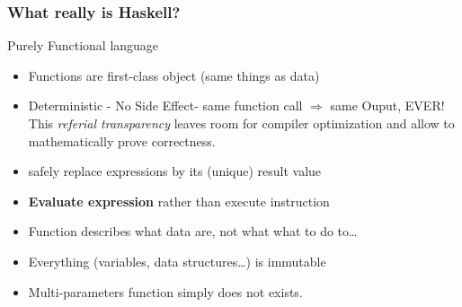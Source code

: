 	\begin{frame}[fragile]\frametitle{What really is Haskell?}
		\begin{block}{Purely Functional language}
			\begin{itemize}
			  \item Functions are first-class object (same things as data)
			\item Deterministic - No Side Effect- same function call $\Rightarrow$ same
			Ouput, EVER!\\
			This \emph{referial transparency} leaves room for compiler optimization and 
			allow to mathematically prove correctness.
			\item safely replace expressions by its (unique) result value
			\item \textbf{Evaluate expression} rather than execute instruction
			\item Function describes what data are, not what what to do to\ldots
			\item Everything (variables, data structures\ldots) is immutable 
			\item Multi-parameters function simply does not exists.
			\end{itemize}
			
		\end{block} 
	
	\end{frame}
	
